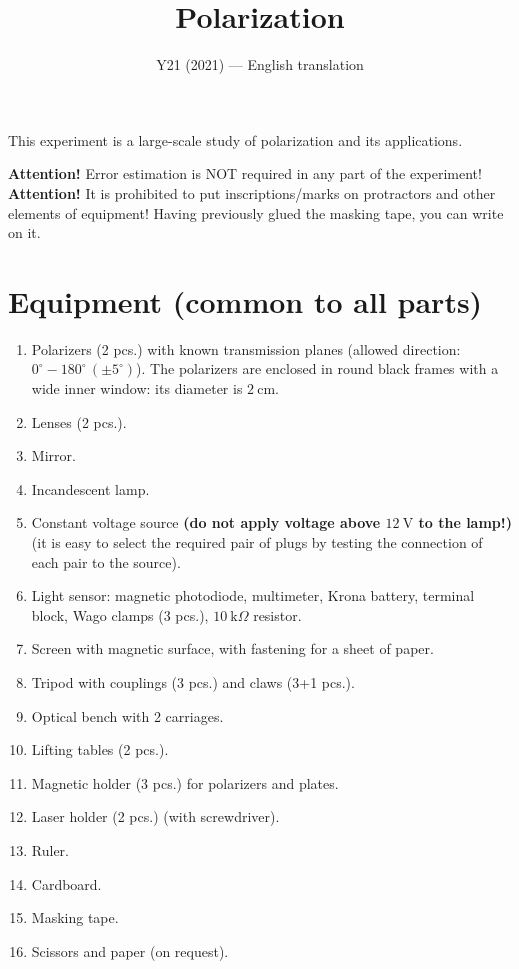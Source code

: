 \documentclass[11pt,a4paper]{article}
\title{\textbf{Polarization}}
\author{\normalsize Y21 (2021) --- English translation}
\date{}
\begin{document}
\maketitle

This experiment is a large-scale study of polarization and its applications.

\textbf{Attention!} Error estimation is NOT required in any part of the experiment!\\ \textbf{Attention!} It is prohibited to put inscriptions/marks on protractors and other elements of equipment! Having previously glued the masking tape, you can write on it.

\section*{Equipment (common to all parts)}

\begin{enumerate}
    \item Polarizers (2 pcs.) with known transmission planes (allowed direction: $0^{\circ}\!-\!180^{\circ}\,(\pm5^{\circ})$). The polarizers are enclosed in round black frames with a wide inner window: its diameter is $2~\text{cm}$.
    \item Lenses (2 pcs.).
    \item Mirror.
    \item Incandescent lamp.
    \item Constant voltage source \textbf{(do not apply voltage above $12~\text{V}$ to the lamp!)} (it is easy to select the required pair of plugs by testing the connection of each pair to the source).
    \item Light sensor: magnetic photodiode, multimeter, Krona battery, terminal block, Wago clamps (3 pcs.), $10~\text{k}\Omega$ resistor.
    \item Screen with magnetic surface, with fastening for a sheet of paper.
    \item Tripod with couplings (3 pcs.) and claws (3+1 pcs.).
    \item Optical bench with 2 carriages.
    \item Lifting tables (2 pcs.).
    \item Magnetic holder (3 pcs.) for polarizers and plates.
    \item Laser holder (2 pcs.) (with screwdriver).
    \item Ruler.
    \item Cardboard.
    \item Masking tape.
    \item Scissors and paper (on request).
\end{enumerate}
\end{document}
